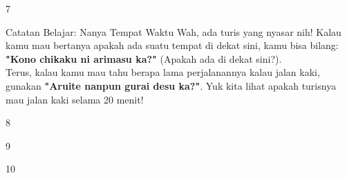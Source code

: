 \begin{convobox}{7}
    \noindent

    \vspace{1.5em}
\end{convobox}

\begin{lessonbox}{Catatan Belajar: Nanya Tempat Waktu}
    Wah, ada turis yang nyasar nih! Kalau kamu mau bertanya apakah ada suatu tempat di dekat sini, kamu bisa bilang: \textbf{"Kono chikaku ni arimasu ka?"} (Apakah ada di dekat sini?). \\
    
    Terus, kalau kamu mau tahu berapa lama perjalanannya kalau jalan kaki, gunakan \textbf{"Aruite nanpun gurai desu ka?"}. Yuk kita lihat apakah turisnya mau jalan kaki selama 20 menit!
\end{lessonbox}

\begin{convobox}{8}
    \noindent

    \vspace{1.5em}
\end{convobox}

\begin{convobox}{9}
    \noindent
      

    \vspace{1.5em}
\end{convobox}

\begin{convobox}{10}
    \noindent
      

    \vspace{1.5em}
\end{convobox}


